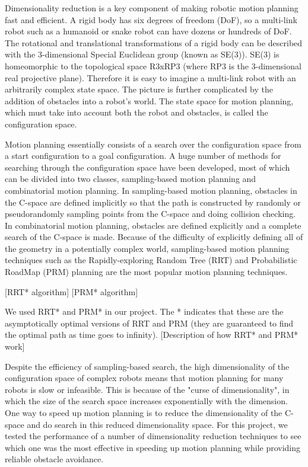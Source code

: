 \documentclass[12pt]{article}
\begin{document}
\maketitle

Dimensionality reduction is a key component of making robotic motion planning
fast and efficient. A rigid body has six degrees of freedom (DoF), so a
multi-link robot such as a humanoid or snake robot can have dozens or hundreds
of DoF. The rotational and translational transformations of a rigid body can be
described with the 3-dimensional Special Euclidean group (known as SE(3)).
SE(3) is homeomorphic to the topological space R3xRP3 (where RP3 is the
3-dimensional real projective plane). Therefore it is easy to imagine a
multi-link robot with an arbitrarily complex state space. The picture is
further complicated by the addition of obstacles into a robot's world. The
state space for motion planning, which must take into account both the robot
and obstacles, is called the configuration space. 

Motion planning essentially consists of a search over the configuration space
from a start configuration to a goal configuration. A huge number of methods
for searching through the configuration space have been developed, most of
which can be divided into two classes, sampling-based motion planning and
combinatorial motion planning. In sampling-based motion planning, obstacles in
the C-space are defined implicitly so that the path is constructed by randomly
or pseudorandomly sampling points from the C-space and doing collision
checking. In combinatorial motion planning, obstacles are defined explicitly
and a complete search of the C-space is made. Because of the difficulty of
explicitly defining all of the geometry in a potentially complex world,
sampling-based motion planning techniques such as the Rapidly-exploring Random
Tree (RRT) and Probabilistic RoadMap (PRM) planning are the most popular motion
planning techniques.

[RRT* algorithm]
[PRM* algorithm]

We used RRT* and PRM* in our project. The * indicates that these are the
asymptotically optimal versions of RRT and PRM (they are guaranteed to find the
optimal path as time goes to infinity). [Description of how RRT* and PRM* work]

Despite the efficiency of sampling-based search, the high dimensionality of the
configuration space of complex robots means that motion planning for many
robots is slow or infeasible. This is because of the "curse of dimensionality",
in which the size of the search space increases exponentially with the
dimension. One way to speed up motion planning is to reduce the dimensionality
of the C-space and do search in this reduced dimensionality space. For this
project, we tested the performance of a number of dimensionality reduction
techniques to see which one was the most effective in speeding up motion
planning while providing reliable obstacle avoidance.
\end{document}
